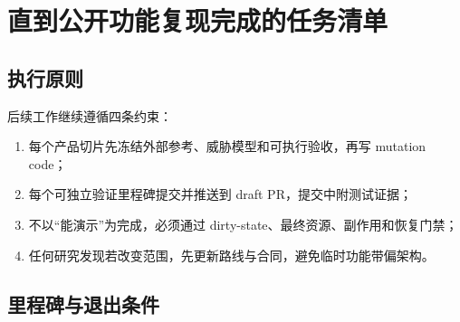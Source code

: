 \documentclass[UTF8,fontset=none,zihao=-4,openany]{ctexrep}
\begin{document}
\chapter{直到公开功能复现完成的任务清单}

\section{执行原则}

后续工作继续遵循四条约束：

\begin{enumerate}
  \item 每个产品切片先冻结外部参考、威胁模型和可执行验收，再写 mutation code；
  \item 每个可独立验证里程碑提交并推送到 draft PR，提交中附测试证据；
  \item 不以“能演示”为完成，必须通过 dirty-state、最终资源、副作用和恢复门禁；
  \item 任何研究发现若改变范围，先更新路线与合同，避免临时功能带偏架构。
\end{enumerate}

\section{里程碑与退出条件}
\end{document}
